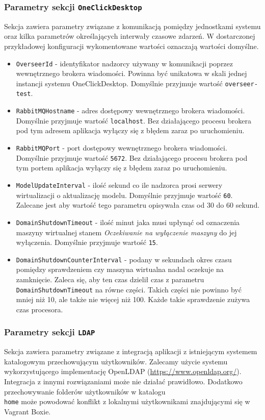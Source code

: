 \documentclass[../opis-rozwiazania.tex]{subfiles}
\begin{document}
\subsubsection{Parametry sekcji \texttt{OneClickDesktop}}
Sekcja zawiera parametry związane z komunikacją pomiędzy jednostkami systemu oraz kilka parametrów określających interwały czasowe zdarzeń.
W dostarczonej przykładowej konfiguracji wykomentowane wartości oznaczają wartości domyślne.
\begin{itemize}
  \item \texttt{OverseerId} - identyfikator nadzorcy używany w komunikacji poprzez wewnętrznego brokera wiadomości. Powinna być unikatowa w skali jednej instancji systemu OneClickDesktop. Domyślnie przyjmuje wartość \texttt{overseer-test}.
  \item \texttt{RabbitMQHostname} - adres dostępowy wewnętrznego brokera wiadomości. Domyślnie przyjmuje wartość \texttt{localhost}. Bez działającego procesu brokera pod tym adresem aplikacja wyłączy się z błędem zaraz po uruchomieniu.
  \item \texttt{RabbitMQPort} - port dostępowy wewnętrznego brokera wiadomości. Domyślnie przyjmuje wartość \texttt{5672}. Bez działającego procesu brokera pod tym portem aplikacja wyłączy się z błędem zaraz po uruchomieniu.
  \item \texttt{ModelUpdateInterval} - ilość sekund co ile nadzorca prosi serwery wirtualizacji o aktualizację modelu. Domyślnie przyjmuje wartość \texttt{60}. Zalecane jest aby wartość tego parametru opisywała czas od 30 do 60 sekund.																												%
  \item \texttt{DomainShutdownTimeout} - ilość minut jaka musi upłynąć od oznaczenia maszyny wirtualnej stanem \textit{Oczekiwanie na wyłączenie maszyny} do jej wyłączenia. Domyślnie przyjmuje wartość \texttt{15}.
  \item \texttt{DomainShutdownCounterInterval} - podany w sekundach okres czasu pomiędzy sprawdzeniem czy maszyna wirtualna nadal oczekuje na zamknięcie. Zaleca się, aby ten czas dzielił czas z parametru \texttt{DomainShutdownTimeout} na równe części. Takich części nie powinno być mniej niż 10, ale także nie więcej niż 100. Każde takie sprawdzenie zużywa czas procesora.
\end{itemize}

\subsubsection{Parametry sekcji \texttt{LDAP}}
Sekcja zawiera parametry związane z integracją aplikacji z istniejącym systemem katalogowym przechowującym użytkowników. Zalecamy użycie systemu wykorzystującego implementację OpenLDAP (\url{https://www.openldap.org/}). Integracja z innymi rozwiązaniami może nie działać prawidłowo. Dodatkowo przechowywanie folderów użytkowników w katalogu \texttt{\\home} może powodować konflikt z lokalnymi użytkownikami znajdującymi się w Vagrant Boxie.
\end{document}
